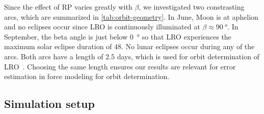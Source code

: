 Since the effect of \gls{RP} varies greatly with $\beta$, we investigated two constrasting arcs, which are summarized in \cref{tab:orbit-geometry}. In June, Moon is at aphelion and no eclipses occur since \gls{LRO} is continuously illuminated at $\beta \approx \qty{90}{\degree}$. In September, the beta angle is just below \qty{0}{\degree} so that \gls{LRO} experiences the maximum solar eclipse duration of \qty{48}{\min}. No lunar eclipses occur during any of the arcs. Both arcs have a length of 2.5 days, which is used for orbit determination of \gls{LRO}~\cite{Nicholson2010,Mazarico2011}. Choosing the same length ensures our results are relevant for error estimation in force modeling for orbit determination.





\subsection{Simulation setup}
\label{subsec:simulation-setup}

